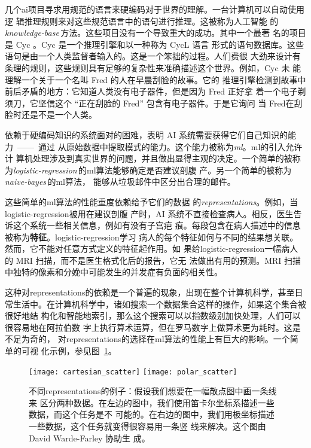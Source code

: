 几个\gls*{ai}项目寻求用规范的语言来硬编码对于世界的理解。一台计算机可以自动使用逻
辑推理规则来对这些规范语言中的语句进行推理。这被称为人工智能
的\emph{\gls{knowledge-base}}\,方法。这些项目没有一个导致重大的成功。其中一个最著
名的项目是 Cyc \citep{Lenat-1989-book}。Cyc 是一个推理引擎和以一种称为 CycL 语言
形式的语句数据库。这些语句是由一个人类监督者输入的。这是一个笨拙的过程。人们费很
大劲来设计有条理的规则，这些规则具有足够的复杂性来准确描述这个世界。例如，Cyc 未
能理解一个关于一个名叫 Fred 的人在早晨刮脸的故事\citep{MachineChangedWorld}。它的
推理引擎检测到故事中前后矛盾的地方：它知道人类没有电子器件，但是因为 Fred 正好拿
着一个电子剃须刀，它坚信这个 ``正在刮脸的 Fred'' 包含有电子器件。于是它询问
当 Fred在刮脸时还是不是一个人类。

依赖于硬编码知识的系统面对的困难，表明 AI 系统需要获得它们自己知识的能力~——~通过
从原始数据中提取模式的能力。这个能力被称为\emph{\gls{ml}}。\gls*{ml}的引入允许计
算机处理涉及到真实世界的问题，并且做出显得主观的决定。一个简单的被称
为\emph{\gls{logistic-regression}}\,的\gls*{ml}算法能够确定是否建议剖腹
产\citep{MorYosef90}。另一个简单的被称为\emph{\gls{naive-bayes}}\,的\gls*{ml}算法，
能够从垃圾邮件中区分出合理的邮件。

这些简单的\gls*{ml}算法的性能重度依赖给予它们的数据
的\emph{\gls{representations}}。例如，当\gls*{logistic-regression}被用在建议剖腹
产时，AI 系统不直接检查病人。相反，医生告诉这个系统一些相关信息，例如有没有子宫疤
痕。每段包含在病人描述中的信息被称为\textbf{特征}。\gls*{logistic-regression}学习
病人的每个特征如何与不同的结果想关联。然而，它不能对任意方式定义的特征起作用。如
果给\gls*{logistic-regression}一幅病人的 MRI 扫描，而不是医生格式化后的报告，它无
法做出有用的预测。MRI 扫描中独特的像素和分娩中可能发生的并发症有负面的相关性。

这种对\gls*{representations}的依赖是一个普遍的现象，出现在整个计算机科学，甚至日
常生活中。在计算机科学中，诸如搜索一个数据集合这样的操作，如果这个集合被很好地结
构化和智能地索引，那么这个搜索可以以指数级别加快处理，人们可以很容易地在阿拉伯数
字上执行算术运算，但在罗马数字上做算术更为耗时。这是不足为奇的，
对\gls*{representations}的选择在\gls*{ml}算法的性能上有巨大的影响。一个简单的可视
化示例，参见图~\ref{fig:different_representations}。

\begin{figure}[h]
  \centering
  \texttt{[image: cartesian\_scatter]}
  \texttt{[image: polar\_scatter]}
  \caption{不同\gls*{representations}的例子：假设我们想要在一幅散点图中画一条线来
    区分两种数据。在左边的图中，我们使用笛卡尔坐标系描述一些数据，而这个任务是不
    可能的。在右边的图中，我们用极坐标描述一些数据，这个任务就变得很容易用一条竖
    线来解决。这个图由 David Warde-Farley 协助生
    成。\label{fig:different_representations}}
\end{figure}


